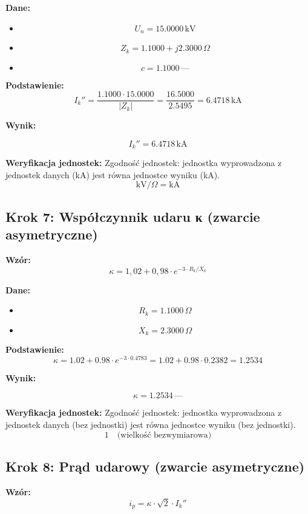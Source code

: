 \documentclass[11pt,a4paper]{article}
\begin{document}
\textbf{Dane:}
\begin{itemize}
  \item
$$
U_n = 15.0000\,\mathrm{kV}
$$
  \item
$$
Z_k = 1.1000 + j2.3000\,\Omega
$$
  \item
$$
c = 1.1000\,\text{—}
$$
\end{itemize}

\textbf{Podstawienie:}
$$
I_k'' = \frac{1.1000 \cdot 15.0000}{|Z_k|} = \frac{16.5000}{2.5495} = 6.4718\,\text{kA}
$$

\textbf{Wynik:}
\begin{center}
$$
I_k'' = 6.4718\,\mathrm{kA}
$$
\end{center}

\textbf{Weryfikacja jednostek:} Zgodność jednostek: jednostka wyprowadzona z jednostek danych (kA) jest równa jednostce wyniku (kA).
$$
\mathrm{kV}/\Omega = \mathrm{kA}
$$

\subsection{Krok 7: Współczynnik udaru κ (zwarcie asymetryczne)}

\textbf{Wzór:}
$$
\kappa = 1{,}02 + 0{,}98 \cdot e^{-3 \cdot R_k / X_k}
$$

\textbf{Dane:}
\begin{itemize}
  \item
$$
R_k = 1.1000\,\Omega
$$
  \item
$$
X_k = 2.3000\,\Omega
$$
\end{itemize}

\textbf{Podstawienie:}
$$
\kappa = 1.02 + 0.98 \cdot e^{-3 \cdot 0.4783} = 1.02 + 0.98 \cdot 0.2382 = 1.2534
$$

\textbf{Wynik:}
\begin{center}
$$
\kappa = 1.2534\,\text{—}
$$
\end{center}

\textbf{Weryfikacja jednostek:} Zgodność jednostek: jednostka wyprowadzona z jednostek danych (bez jednostki) jest równa jednostce wyniku (bez jednostki).
$$
1 \quad \text{(wielkość bezwymiarowa)}
$$

\subsection{Krok 8: Prąd udarowy (zwarcie asymetryczne)}

\textbf{Wzór:}
$$
i_p = \kappa \cdot \sqrt{2} \cdot I_k''
$$
\end{document}
